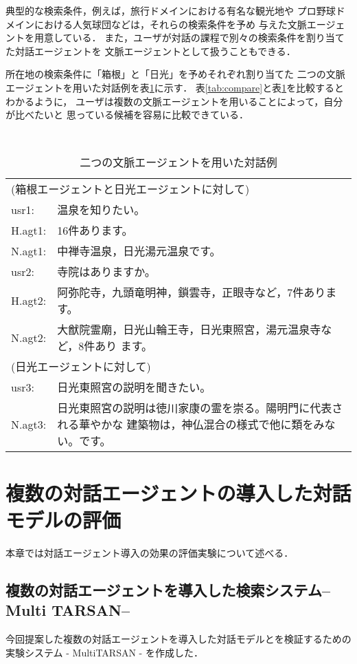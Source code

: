典型的な検索条件，例えば，旅行ドメインにおける有名な観光地や
プロ野球ドメインにおける人気球団などは，それらの検索条件を予め
与えた文脈エージェントを用意している．
また，ユーザが対話の課程で別々の検索条件を割り当てた対話エージェントを
文脈エージェントとして扱うこともできる．

所在地の検索条件に「箱根」と「日光」を予めそれぞれ割り当てた
二つの文脈エージェントを用いた対話例を表\ref{tab:c-agent}に示す．
表\ref{tab:compare}と表\ref{tab:c-agent}を比較するとわかるように，
ユーザは複数の文脈エージェントを用いることによって，自分が比べたいと
思っている候補を容易に比較できている．

\begin{table}[htp]
\bigskip
\centering \tt
\caption{二つの文脈エージェントを用いた対話例}\label{tab:c-agent}
\begin{tabular}[t]{lp{120mm}}
\hline\hline
\multicolumn{2}{l}{(箱根エージェントと日光エージェントに対して)}\\
usr1:& 温泉を知りたい。\\
H.agt1:& 16件あります。\\
N.agt1:& 中禅寺温泉，日光湯元温泉です。\\
usr2:& 寺院はありますか。\\
H.agt2:& 阿弥陀寺，九頭竜明神，鎖雲寺，正眼寺など，7件あります。\\
N.agt2:& 大猷院霊廟，日光山輪王寺，日光東照宮，湯元温泉寺など，8件あり
ます。\\
\multicolumn{2}{l}{(日光エージェントに対して)}\\
usr3:& 日光東照宮の説明を聞きたい。\\
N.agt3:& 日光東照宮の説明は徳川家康の霊を崇る。陽明門に代表される華やかな
建築物は，神仏混合の様式で他に類をみない。です。\\
\hline\hline
\end{tabular}
\end{table}

\section{複数の対話エージェントの導入した対話モデルの評価}\label{sec:daev}
本章では対話エージェント導入の効果の評価実験について述べる．

\subsection{複数の対話エージェントを導入した検索システム--Multi TARSAN--}
今回提案した複数の対話エージェントを導入した対話モデルとを検証するための
実験システム - MultiTARSAN - を作成した．


